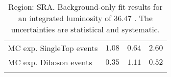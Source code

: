 \begin{table}
\begin{center}
{\begin{tabular*}{\textwidth}{@{\extracolsep{\fill}}lrrr}
        MC exp. SingleTop events         & $1.08$          & $0.64$          & $2.60$              \\
        MC exp. Diboson events         & $0.35$          & $1.11$          & $0.52$              \\
\noalign{\smallskip}\hline\noalign{\smallskip}
\end{tabular*}
}
\end{center}
\caption{Region: SRA. Background-only fit results for an integrated luminosity of 36.47 \ifb. The uncertainties are statistical and systematic.
}
\label{table.bkgonly.SRA}
\end{table}
%